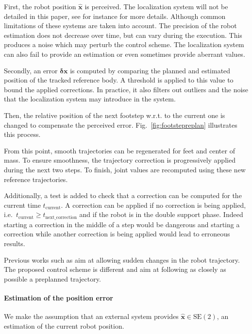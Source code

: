 First, the robot position $\hat{\mathbf{x}}$ is perceived. The
localization system will not be detailed in this paper, see
\cite{08ijhr.stasse, 06humanoids.thompson} for instance for more
details. Although common limitations of these systems are taken into
account. The precision of the robot estimation does not decrease over
time, but can vary during the execution. This produces a noise which
may perturb the control scheme. The localization system can also fail
to provide an estimation or even sometimes provide aberrant values.

Secondly, an error $\mathbf{\delta \mathbf{x}}$ is computed by
comparing the planned and estimated position of the tracked reference
body. A threshold is applied to this value to bound the applied
corrections. In practice, it also filters out outliers and the noise
that the localization system may introduce in the system.

Then, the relative position of the next footstep w.r.t. to the current
one is changed to compensate the perceived
error. Fig.~\ref{fig:footstepreplan} illustrates this process.


From this point, smooth trajectories can be regenerated for feet and
center of mass. To ensure smoothness, the trajectory correction is
progressively applied during the next two steps. To finish, joint
values are recomputed using these new reference trajectories.



Additionally, a test is added to check that a correction can be
computed for the current time $t_{\text{current}}$. A correction can
be applied if no correction is being applied,
i.e.\ \mbox{$t_{\text{current}} \geq t_{\text{next\_correction}}$} and if the
robot is in the double support phase. Indeed starting a correction in
the middle of a step would be dangerous and starting a correction
while another correction is being applied would lead to erroneous
results.


Previous works such as \cite{04humanoids.harada, 07icra.morisawa} aim
at allowing sudden changes in the robot trajectory. The proposed
control scheme is different and aim at following as closely as
possible a preplanned trajectory.


\paragraph{Estimation of the position error}

We make the assumption that an external system provides
\mbox{$\hat{\mathbf{x}} \in \text{SE}(2)$}, an estimation of the
current robot position.

